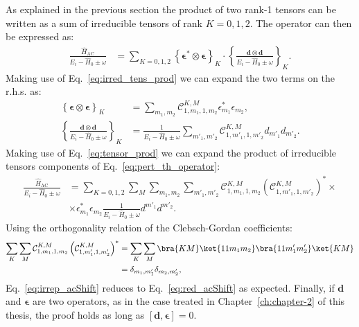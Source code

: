 As explained in the previous section the product of two rank-1 tensors can be written as a sum of irreducible tensors of rank $K=0,1,2$. The operator can then be expressed as:
\begin{align}
	\frac{\hat{H}_{\mathrm{AC}}}{E_i - \hat{H}_0\pm \omega} &= \sum\limits_{K=0,1,2}\left\{\boldsymbol{\epsilon}^* \otimes \boldsymbol{\epsilon}\right\}_K\cdot \left\{\frac{\mathbf{d}\otimes\mathbf{d}}{E_i - \hat{H}_0\pm \omega} \right\}_K. %
	\label{eq:pert_th_operator}
\end{align}
Making use of Eq.~\eqref{eq:irred_tens_prod} we can expand the two terms on the r.h.s. as:
\begin{align}
	\left\{\boldsymbol{\epsilon}\otimes \boldsymbol{\epsilon}\right\}_K &= \sum\limits_{m_1,m_2} \mathcal{C}^{K,M}_{1, m_1,1,m_2}\epsilon^*_{m_1}\epsilon_{m_2}, \\
	\left\{\frac{\mathbf{d}\otimes \mathbf{d}}{E_i - \hat{H}_0\pm \omega}\right\}_K &= \frac{1}{E_i - \hat{H}_0\pm \omega} \sum\limits_{m'_1,m'_2} \mathcal{C}^{K,M}_{1, m'_1,1,m'_2}d_{m'_1}d_{m'_2}.
\end{align}
Making use of Eq.~\eqref{eq:tensor_prod} we can expand the product of irreducible tensors components of Eq.~\eqref{eq:pert_th_operator}:
\begin{align}
	\frac{\hat{H}_{\mathrm{AC}}}{E_i - \hat{H}_0\pm \omega} &=\sum\limits_{K=0,1,2}\sum_M \sum\limits_{m_1,m_2} \sum\limits_{m'_1,m'_2}\mathcal{C}^{K,M}_{1, m_1,1,m_2} \left(\mathcal{C}^{K,M}_{1, m'_1,1,m'_2}\right)^* \times \nonumber\\
	&\times\epsilon^*_{m_1}\epsilon_{m_2}\frac{1}{E_i - \hat{H}_0\pm \omega} d^{m'_1}d^{m'_2}.
	\label{eq:irrep_acShift}
\end{align}
Using the orthogonality relation of the Clebsch-Gordan coefficients:
\begin{align}
	\sum_K\sum_M\mathcal{C}^{K,M}_{1, m_1,1,m_2} \left(\mathcal{C}^{K,M}_{1, m'_1,1,m'_2}\right)^* &= \sum_K\sum_M\bra{KM}\ket{11m_1m_2}\bra{11m'_1m'_2}\ket{KM}\nonumber\\
	&=\delta_{m_1,m_1'}\delta_{m_2,m_2'},
\end{align}
Eq.~\eqref{eq:irrep_acShift} reduces to Eq.~\eqref{eq:red_acShift} as expected. Finally, if $\mathbf{d}$ and $\boldsymbol{\epsilon}$ are two operators, as in the case treated in Chapter~\ref{ch:chapter-2} of this thesis, the proof holds as long as $\left[\mathbf{d},\boldsymbol{\epsilon}\right]=0$. 

